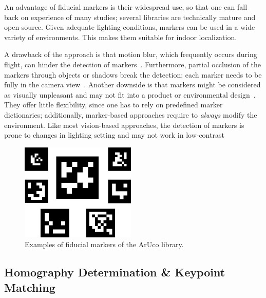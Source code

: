 \documentclass{report}
\begin{document}
An advantage of fiducial markers is their widespread use, so that one
can fall back on experience of many studies; several libraries are
technically mature and open-source. Given adequate lighting
conditions, markers can be used in a wide variety of
environments. This makes them suitable for indoor localization.

A drawback of the approach is that motion blur, which frequently
occurs during flight, can hinder the detection of
markers~\cite{albasiouny2015mean}. Furthermore, partial occlusion of
the markers through objects or shadows break the detection; each
marker needs to be fully in the camera
view~\cite{hornecker2005using}. Another downside is that markers might
be considered as visually unpleasant and may not fit into a product or
environmental design~\cite{chu2013halftone}. They offer little
flexibility, since one has to rely on predefined marker dictionaries;
additionally, marker-based approaches require to \emph{always} modify
the environment. Like most vision-based approaches, the detection of
markers is prone to changes in lighting setting and may not work in
low-contrast



\begin{figure}[h!]
\begin{center}
\includegraphics[width=0.252\columnwidth]{markers}
\caption{{\label{fig:aruco}
Examples of fiducial markers of the ArUco library.%
}}
\end{center}
\end{figure}

\subsection{Homography Determination \& Keypoint Matching}
\label{sec:keypointmatching}
\end{document}
